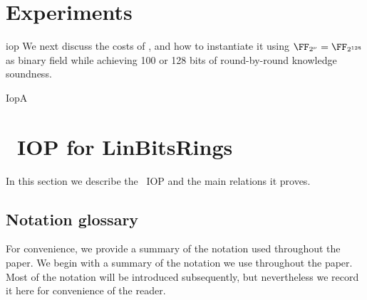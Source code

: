 \iflncs\section{Experiments}\label{s:experiments}\fi
{}
\begin{lncsappendix}{iop}
    \iflncs We next discuss the costs of \ftwoz, and how to instantiate it using $\comfield=\FF_{2^{128}}$ as binary field while achieving 100 or 128 bits of round-by-round knowledge soundness.\else\fi
\begin{lncsmove}{IopA}
    \section{\ftwoz \ IOP for LinBitsRings}\iflncs\label{s:tech_overview}\fi

In this section we describe the \ftwoz\ IOP and the main relations it proves.
\end{lncsmove}
\iflncs\subsection{Notation glossary}\fi
\iflncs For convenience, we provide a summary of the notation used throughout the paper.  \else We begin with a summary of the notation we use throughout the paper. Most of the notation will be introduced subsequently, but nevertheless we record it here for convenience of the reader. \fi


\end{lncsappendix}

